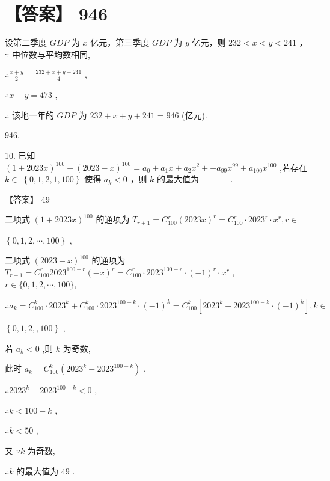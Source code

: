 \documentclass[10pt]{article}
\begin{document}
\section*{【答案】 946}

设第二季度 \({GDP}\) 为 \(x\) 亿元，第三季度 \({GDP}\) 为 \(y\) 亿元，则 \({232} < x < y < {241}\) ， \(\because\) 中位数与平均数相同,

\(\therefore \frac{x + y}{2} = \frac{{232} + x + y + {241}}{4}\) ,

\(\therefore x + y = {473}\) ,

\(\therefore\) 该地一年的 \({GDP}\) 为 \({232} + x + y + {241} = {946}\) (亿元).

946.

10. 已知 \({\left( 1 + {2023}x\right) }^{100} + {\left( {2023} - x\right) }^{100} = {a}_{0} + {a}_{1}x + {a}_{2}{x}^{2} +  + {a}_{99}{x}^{99} + {a}_{100}{x}^{100}\) ,若存在 \(k \in \; \left\{  {0,1,2,1,{100}}\right\}\) 使得 \({a}_{k} < 0\) ，则 \(k\) 的最大值为\_\_\_\_\_.

【答案】 49

二项式 \({\left( 1 + {2023}x\right) }^{100}\) 的通项为 \({T}_{r + 1} = {C}_{100}^{r}{\left( {2023}x\right) }^{r} = {C}_{100}^{r} \cdot  {2023}^{r} \cdot  {x}^{r},r \in\)

\(\left\{  {0,1,2,\cdots ,{100}}\right\}\) ,

二项式 \({\left( {2023} - x\right) }^{100}\) 的通项为 \({T}_{r + 1} = {C}_{100}^{r}{2023}^{{100} - r}{\left( -x\right) }^{r} = {C}_{100}^{r} \cdot  {2023}^{{100} - r} \cdot  {\left( -1\right) }^{r} \cdot  {x}^{r}\) , \(r \in  \{ 0,1,2,\cdots ,{100}\} ,\)

\(\therefore {a}_{k} = {C}_{100}^{k} \cdot  {2023}^{k} + {C}_{100}^{k} \cdot  {2023}^{{100} - k} \cdot  {\left( -1\right) }^{k} = {C}_{100}^{k}\left\lbrack  {{2023}^{k} + {2023}^{{100} - k} \cdot  {\left( -1\right) }^{k}}\right\rbrack  ,k \in\)

\(\left\{  {0,1,2,,{100}}\right\}\) ,

若 \({a}_{k} < 0\) ,则 \(k\) 为奇数,

此时 \({a}_{k} = {C}_{100}^{k}\left( {{2023}^{k} - {2023}^{{100} - k}}\right)\) ,

\(\therefore {2023}^{k} - {2023}^{{100} - k} < 0\) ,

\(\therefore k < {100} - k\) ,

\(\therefore k < {50}\) ,

又 \(\because k\) 为奇数,

\(\therefore k\) 的最大值为 49 .
\end{document}

